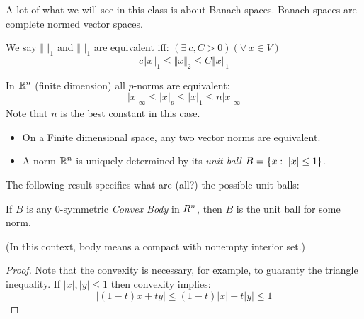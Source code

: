 A lot of what we will see in this class is about Banach spaces. Banach spaces are complete normed vector spaces.

\begin{ddef}
We say $\Vert\ \Vert_1$ and $ \Vert\ \Vert_1$ are equivalent iff:
$(\exists \ c,C>0)(\forall\ x\in V)$
$$c\Vert x \Vert_1 \leq \Vert x \Vert_2 \leq C\Vert x\Vert_1$$
\end{ddef}

\begin{teorema}
In $\mathbb{R}^n$ (finite dimension) all $p$-norms are equivalent:
$$|x|_\infty \leq |x|_p \leq |x|_1 \leq n|x|_\infty$$
Note that $n$ is the best constant in this case.
\end{teorema}

\begin{remarks}
    \begin{itemize}
    \item On a Finite dimensional space, any two vector norms are equivalent.
    \item A norm $\mathbb{R}^n$ is uniquely determined by its \emph{unit ball} $B=\{x:\; |x| \leq 1 \}$.
    \end{itemize}
\end{remarks}

The following result specifies what are (all?) the possible unit balls:
\begin{teorema}
    If $B$ is any 0-symmetric \emph{Convex Body} in $\\R^n$, then $B$ is the unit ball for some norm.

    (In this context, body means a compact with nonempty interior set.)
    \begin{proof}
        Note that the convexity is necessary, for example, to guaranty the triangle inequality. If $|x|,|y|\leq 1$ then convexity implies:
        $$|(1-t)x+ty| \leq (1-t)|x| + t|y| \leq 1$$
    \end{proof}
\end{teorema}
    
